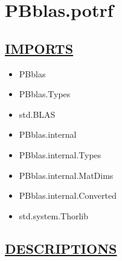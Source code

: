 \chapter*{PBblas.potrf}
\hypertarget{PBblas.potrf}{}

\section*{\underline{IMPORTS}}
\begin{itemize}
\item PBblas
\item PBblas.Types
\item std.BLAS
\item PBblas.internal
\item PBblas.internal.Types
\item PBblas.internal.MatDims
\item PBblas.internal.Converted
\item std.system.Thorlib
\end{itemize}

\section*{\underline{DESCRIPTIONS}}
